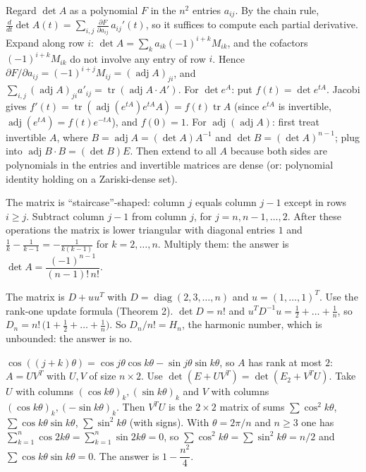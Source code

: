 \documentclass[11pt,a4paper]{article}
\begin{document}

Regard \(\det A\) as a polynomial \(F\) in the \(n^2\) entries \(a_{ij}\). By the chain rule, \(\frac{d}{dt}\det A(t)=\sum_{i,j}\frac{\partial F}{\partial a_{ij}}\,a_{ij}'(t)\), so it suffices to compute each partial derivative.
Expand along row \(i\): \(\det A=\sum_k a_{ik}(-1)^{i+k}M_{ik}\), and the cofactors \((-1)^{i+k}M_{ik}\) do not involve any entry of row \(i\). Hence \(\partial F/\partial a_{ij}=(-1)^{i+j}M_{ij}=(\operatorname{adj}A)_{ji}\), and \(\sum_{i,j}(\operatorname{adj}A)_{ji}a'_{ij}=\operatorname{tr}(\operatorname{adj}A\cdot A')\).
For \(\det e^{A}\): put \(f(t)=\det e^{tA}\). Jacobi gives \(f'(t)=\operatorname{tr}(\operatorname{adj}(e^{tA})e^{tA}A)=f(t)\operatorname{tr}A\) (since \(e^{tA}\) is invertible, \(\operatorname{adj}(e^{tA})=f(t)e^{-tA}\)), and \(f(0)=1\). For \(\operatorname{adj}(\operatorname{adj}A)\): first treat invertible \(A\), where \(B=\operatorname{adj}A=(\det A)A^{-1}\) and \(\det B=(\det A)^{n-1}\); plug into \(\operatorname{adj}B\cdot B=(\det B)E\). Then extend to all \(A\) because both sides are polynomials in the entries and invertible matrices are dense (or: polynomial identity holding on a Zariski-dense set).

The matrix is ``staircase''-shaped: column \(j\) equals column \(j-1\) except in rows \(i\ge j\). Subtract column \(j-1\) from column \(j\), for \(j=n,n-1,\dots,2\).
After these operations the matrix is lower triangular with diagonal entries \(1\) and \(\frac1k-\frac1{k-1}=-\frac{1}{k(k-1)}\) for \(k=2,\dots,n\). Multiply them: the answer is \(\det A=\dfrac{(-1)^{n-1}}{(n-1)!\,n!}\).

The matrix is \(D+uu^T\) with \(D=\operatorname{diag}(2,3,\dots,n)\) and \(u=(1,\dots,1)^T\). Use the rank-one update formula (Theorem 2).
\(\det D=n!\) and \(u^TD^{-1}u=\tfrac12+\dots+\tfrac1n\), so \(D_n=n!\,\bigl(1+\tfrac12+\dots+\tfrac1n\bigr)\). So \(D_n/n!=H_n\), the harmonic number, which is unbounded: the answer is no.

\(\cos((j+k)\theta)=\cos j\theta\cos k\theta-\sin j\theta\sin k\theta\), so \(A\) has rank at most \(2\): \(A=UV^T\) with \(U,V\) of size \(n\times 2\). Use \(\det(E+UV^T)=\det(E_2+V^TU)\).
Take \(U\) with columns \((\cos k\theta)_k,(\sin k\theta)_k\) and \(V\) with columns \((\cos k\theta)_k,(-\sin k\theta)_k\). Then \(V^TU\) is the \(2\times2\) matrix of sums \(\sum\cos^2k\theta\), \(\sum\cos k\theta\sin k\theta\), \(\sum\sin^2 k\theta\) (with signs).
With \(\theta=2\pi/n\) and \(n\ge3\) one has \(\sum_{k=1}^n\cos 2k\theta=\sum_{k=1}^n\sin 2k\theta=0\), so \(\sum\cos^2k\theta=\sum\sin^2k\theta=n/2\) and \(\sum\cos k\theta\sin k\theta=0\). The answer is \(1-\dfrac{n^2}{4}\).
\end{document}
